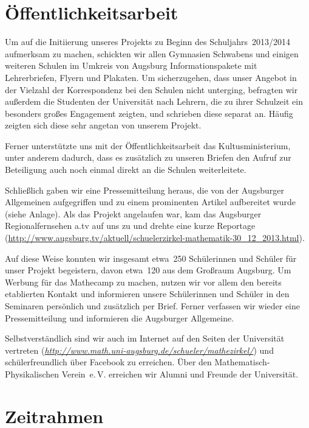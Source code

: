 \documentclass[12pt]{zettel}
\begin{document}
\section{Öffentlichkeitsarbeit}

Um auf die Initiierung unseres Projekts zu Beginn des Schuljahrs~2013/2014
aufmerksam zu machen, schickten wir allen Gymnasien Schwabens und einigen
weiteren Schulen im Umkreis von Augsburg Informationspakete mit Lehrerbriefen,
Flyern und Plakaten. Um sicherzugehen, dass unser Angebot in der
Vielzahl der Korrespondenz bei den Schulen nicht unterging, befragten wir außerdem
die Studenten der Universität nach Lehrern, die zu ihrer Schulzeit ein
besonders großes Engagement zeigten, und schrieben diese separat an.
Häufig zeigten sich diese sehr angetan von unserem Projekt.

Ferner unterstützte uns mit der Öffentlichkeitsarbeit das Kultusministerium,
unter anderem dadurch, dass es zusätzlich zu unseren Briefen den Aufruf zur
Beteiligung auch noch einmal direkt an die Schulen weiterleitete.

Schließlich gaben wir eine Pressemitteilung heraus, die von der
Augsburger Allgemeinen aufgegriffen und zu einem prominenten Artikel aufbereitet
wurde (siehe Anlage). Als das Projekt angelaufen war, kam das Augsburger
Regionalfernsehen a.tv auf uns zu und drehte eine kurze Reportage
(\href{http://www.augsburg.tv/aktuell/schuelerzirkel-mathematik-30_12_2013.html}{\textsf{http:/\!/www.augsburg.tv/aktuell/schuelerzirkel-mathematik-30\_{}12\_{}2013.html}}).

Auf diese Weise konnten wir insgesamt etwa~250 Schülerinnen und Schüler für
unser Projekt begeistern, davon etwa~120 aus dem Großraum Augsburg. Um Werbung für
das Mathecamp zu machen, nutzen wir vor allem den bereits etablierten Kontakt
und informieren unsere Schülerinnen und Schüler in den Seminaren persönlich und
zusätzlich per Brief. Ferner verfassen wir wieder eine Pressemitteilung und
informieren die Augsburger Allgemeine.

Selbstverständlich sind wir auch im Internet auf den Seiten der Universität
vertreten
(\href{http://www.math.uni-augsburg.de/schueler/mathezirkel/}{\textsl{http:/\!/www.math.uni-augsburg.de/schueler/mathezirkel/}})
und schülerfreundlich über Facebook zu erreichen. Über den
Mathematisch-Physikalischen Verein~e.\,V. erreichen wir Alumni und Freunde der
Universität.


\section{Zeitrahmen}
\end{document}
